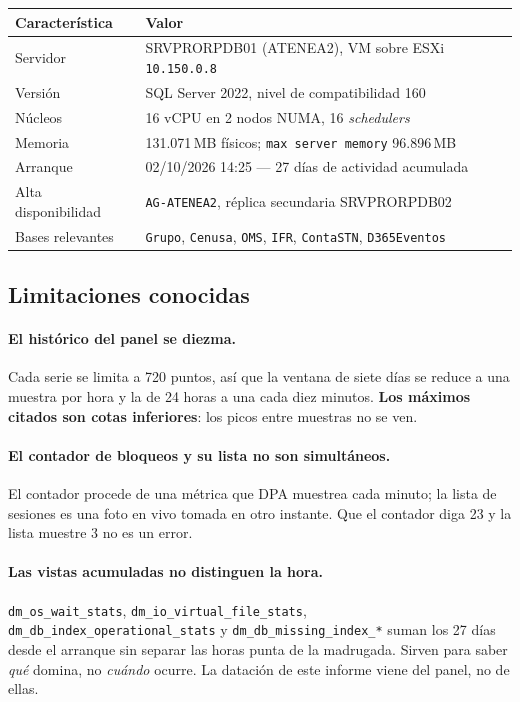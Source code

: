 \documentclass[11pt,a4paper]{article}
\newcommand{\cod}[1]{\texttt{\small #1}}
\begin{document}
\begin{table}[h]
\centering
\small
\begin{tabular}{ll}
\toprule
\textbf{Característica} & \textbf{Valor} \\
\midrule
Servidor              & SRVPRORPDB01 (ATENEA2), VM sobre ESXi \cod{10.150.0.8} \\
Versión               & SQL Server 2022, nivel de compatibilidad 160 \\
Núcleos               & 16 vCPU en 2 nodos NUMA, 16 \emph{schedulers} \\
Memoria               & 131.071\,MB físicos; \cod{max server memory} 96.896\,MB \\
Arranque              & 02/10/2026 14:25 — 27 días de actividad acumulada \\
Alta disponibilidad   & \cod{AG-ATENEA2}, réplica secundaria SRVPRORPDB02 \\
Bases relevantes      & \cod{Grupo}, \cod{Cenusa}, \cod{OMS}, \cod{IFR},
                        \cod{ContaSTN}, \cod{D365Eventos} \\
\bottomrule
\end{tabular}
\end{table}

\subsection{Limitaciones conocidas}

\paragraph{El histórico del panel se diezma.} Cada serie se limita a 720
puntos, así que la ventana de siete días se reduce a una muestra por hora y
la de 24 horas a una cada diez minutos. \textbf{Los máximos citados son cotas
inferiores}: los picos entre muestras no se ven.

\paragraph{El contador de bloqueos y su lista no son simultáneos.} El
contador procede de una métrica que DPA muestrea cada minuto; la lista de
sesiones es una foto en vivo tomada en otro instante. Que el contador diga 23
y la lista muestre 3 no es un error.

\paragraph{Las vistas acumuladas no distinguen la hora.}
\cod{dm\_os\_wait\_stats}, \cod{dm\_io\_virtual\_file\_stats},
\cod{dm\_db\_index\_operational\_stats} y \cod{dm\_db\_missing\_index\_*}
suman los 27 días desde el arranque sin separar las horas punta de la
madrugada. Sirven para saber \emph{qué} domina, no \emph{cuándo} ocurre. La
datación de este informe viene del panel, no de ellas.
\end{document}

